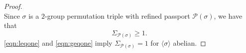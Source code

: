 \documentclass{dcthesis}
\newcommand{\ZZ}{\mathbb Z}
\newcommand{\wt}[1]{\widetilde{#1}}
\numberwithin{equation}{section}
\theoremstyle{definition}
\theoremstyle{remark}
\begin{document}
{{{\begin{proof}
\begin{equation}
      \end{equation}
      Since $\sigma$ is a $2$-group
      permutation triple with refined passport
      $\mathscr{P}(\sigma)$,
      we have that
      \begin{equation}
        \label{eqn:geqone}
        \Sigma_{\mathscr{P}(\sigma)}\geq 1.
      \end{equation}
      \eqref{eqn:leqone} and
      \eqref{eqn:geqone}
      imply
      $\Sigma_{\mathscr{P}(\sigma)}=1$
      for $\langle\sigma\rangle$ abelian.
    \end{proof}
}}}
\end{document}
